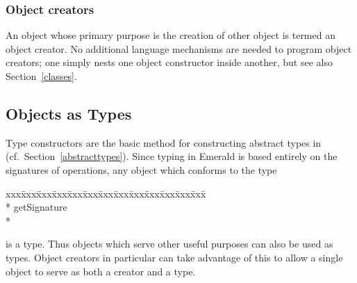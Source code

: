 \subsubsection{Object creators}
An object whose primary purpose is the creation of other object is termed an
object creator.  No additional language mechanisms are needed to program
object creators; one simply nests one object constructor inside another, but
see also Section~\ref{classes}.

\subsection{Objects as Types}
\label{objectsastypes}
Type constructors are the basic method for
constructing abstract types in \emd{} (cf.~Sec\-tion~\ref{abstracttypes}).
Since typing in Emerald is based entirely on the signatures of operations,
any object which conforms to the type

{\it\begin{minipage}{\textwidth}\begin{tabbing}
xxx\=xxx\=xxx\=xxx\=xxx\=xxx\=xxx\=xxx\=xxx\=xxx\=xxx\=xxx\=xxx\=\+\kill%
  \+\\*{}%
   getSignature \returns{} \/\LB{}\/\RB{}\-\\*{}%
 
\end{tabbing}\end{minipage}}

is a type.  Thus objects which serve other useful purposes can also be used
as types.  Object creators in particular can take advantage of this to
allow a single object to serve as both a creator and a type.

